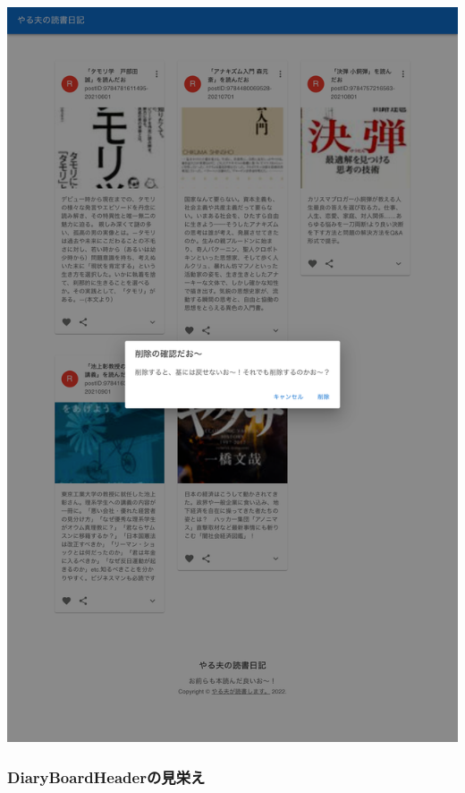 \begin{reviewimage}[H]%
\includegraphics[width=0.7\maxwidth]{./images/03-todo-with-react/mui014-card-deleteDialog-done.png}%
\label{image:03-todo-with-react:mui014-card-deleteDialog-done}
\end{reviewimage}

\subsubsection*{DiaryBoardHeaderの見栄え}
\keeplastskip{
  \label{sec:3-3-6-2}
  \label{sec-0336-2}
  \par\nobreak
}

